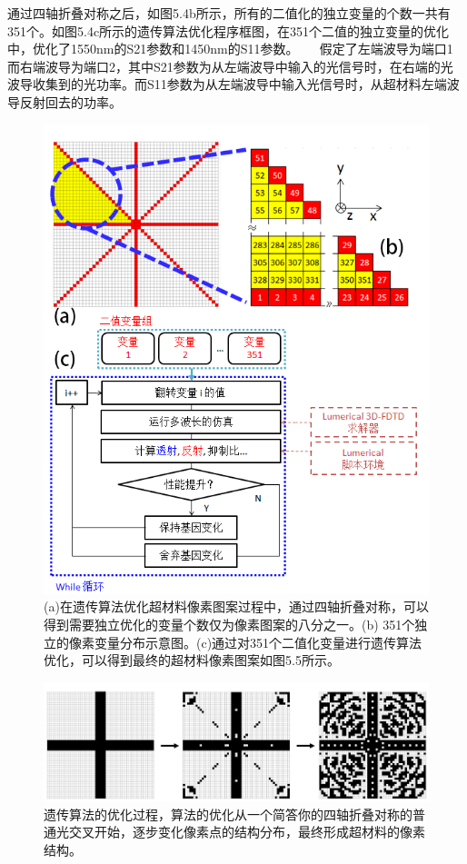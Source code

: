 通过四轴折叠对称之后，如图5.4b所示，所有的二值化的独立变量的个数一共有351个。如图5.4c所示的遗传算法优化程序框图，在351个二值的独立变量的优化中，优化了1550nm的S21参数和1450nm的S11参数。
　
假定了左端波导为端口1而右端波导为端口2，其中S21参数为从左端波导中输入的光信号时，在右端的光波导收集到的光功率。而S11参数为从左端波导中输入光信号时，从超材料左端波导反射回去的功率。

\begin{figure}[!htbp]
    \centering
    \includegraphics[width=1\textwidth]{Img/5-4.png}
    \caption{(a)在遗传算法优化超材料像素图案过程中，通过四轴折叠对称，可以得到需要独立优化的变量个数仅为像素图案的八分之一。(b) 351个独立的像素变量分布示意图。(c)通过对351个二值化变量进行遗传算法优化，可以得到最终的超材料像素图案如图5.5所示。}
    \label{fig:5-4}
\end{figure}

\begin{figure}[!htbp]
    \centering
    \includegraphics[width=1\textwidth]{Img/5-5.png}
    \caption{遗传算法的优化过程，算法的优化从一个简答你的四轴折叠对称的普通光交叉开始，逐步变化像素点的结构分布，最终形成超材料的像素结构。}
    \label{fig:5-5}
\end{figure}

